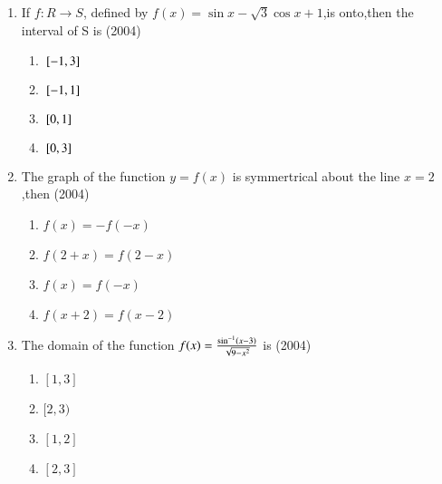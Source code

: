 \documentclass[journal,12pt,twocolumn]{IEEEtran}
\theoremstyle{remark}
\begin{document}
\begin{enumerate}[start=4]
\item If $f:R\to S$, defined by $f(x)=\sin{x}-\sqrt{3}\cos{x}+1$,is onto,then the interval of S is \hfill(2004)

	       \begin{enumerate}
		       \item ${}\left[-1,3\right]$
		       \item ${}\left[-1,1\right]$
		       \item ${}\left[0,1\right]$
		       \item ${}\left[0,3\right]$
	       \end{enumerate}

       \item The graph of the function $y=f(x)$ is symmertrical about the line $x=2$,then \hfill(2004)
	       \begin{enumerate}
		       \item $f(x)=-f(-x)$
		       \item $f(2+x)=f(2-x)$
		       \item $f(x)=f(-x)$
		       \item $f(x+2)=f(x-2)$
	       \end{enumerate}

       \item The domain of the function $f(x)=\frac{\sin^{-1}\left(x-3\right)}{\sqrt{9-x^{2}}}$ is \hfill(2004)
              \begin{enumerate}
		      \item $[1,3]$
		      \item $[2,3)$
		      \item $[1,2]$
		      \item $[2,3]$
	      \end{enumerate}


\end{enumerate}
\end{document}
